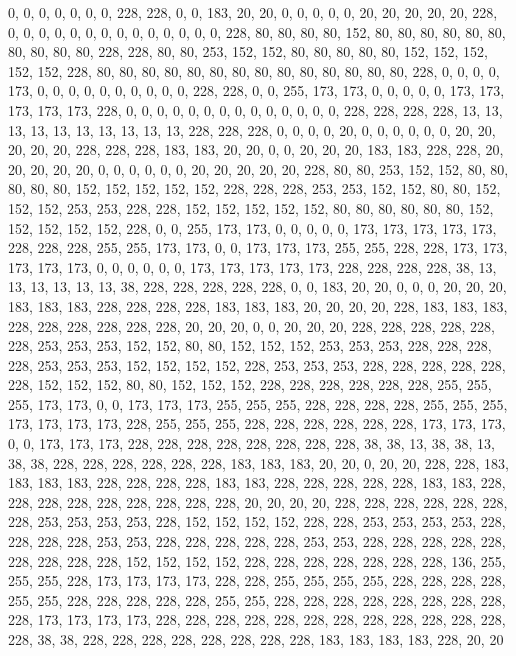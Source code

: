 {	0,   0,   0,   0,   0,   0,   0,   228, 228, 0,   0,   183, 20,  20,  0,   0,   0,   0,   0,   20,  20,  20,  20,  20,  228, 0,   0,   0,   0,   0,   0,   0,   0,   0,   0,   0,   0,   0,   0,   228, 80,  80,  80,  80,  152, 80,  80,  80,  80,  80,  80,  80,  80,  80,  80,  228, 228, 80,  80,  253, 152, 152, 80,  80,  80,  80,  80,  152, 152, 152, 152, 152, 228, 80,  80,  80,  80,  80,  80,  80,  80,  80,  80,  80,  80,  80,  80,  228, 0,   0,   0,   0,   173, 0,   0,   0,   0,   0,   0,   0,   0,   0,   0,   228, 228, 0,   0,   255, 173, 173, 0,   0,   0,   0,   0,   173, 173, 173, 173, 173, 228, 0,   0,   0,   0,   0,   0,   0,   0,   0,   0,   0,   0,   0,   0,   228, 228, 228, 228, 13,  13,  13,  13,  13,  13,  13,  13,  13,  13,  228, 228, 228, 0,   0,   0,   0,   20,  0,   0,   0,   
	0,   0,   0,   20,  20,  20,  20,  20,  228, 228, 228, 183, 183, 20,  20,  0,   0,   20,  20,  20,  183, 183, 228, 228, 20,  20,  20,  20,  20,  0,   0,   0,   0,   0,   0,   20,  20,  20,  20,  20,  228, 80,  80,  253, 152, 152, 80,  80,  80,  80,  80,  152, 152, 152, 152, 152, 228, 228, 228, 253, 253, 152, 152, 80,  80,  152, 152, 152, 253, 253, 228, 228, 152, 152, 152, 152, 152, 80,  80,  80,  80,  80,  80,  152, 152, 152, 152, 152, 228, 0,   0,   255, 173, 173, 0,   0,   0,   0,   0,   173, 173, 173, 173, 173, 228, 228, 228, 255, 255, 173, 173, 0,   0,   173, 173, 173, 255, 255, 228, 228, 173, 173, 173, 173, 173, 0,   0,   0,   0,   0,   0,   173, 173, 173, 173, 173, 228, 228, 228, 228, 38,  13,  13,  13,  13,  13,  13,  38,  228, 228, 228, 228, 228, 0,   0,   183, 20,  20,  0,   0,   
	0,   20,  20,  20,  183, 183, 183, 228, 228, 228, 228, 183, 183, 183, 20,  20,  20,  20,  228, 183, 183, 183, 228, 228, 228, 228, 228, 228, 20,  20,  20,  0,   0,   20,  20,  20,  228, 228, 228, 228, 228, 228, 253, 253, 253, 152, 152, 80,  80,  152, 152, 152, 253, 253, 253, 228, 228, 228, 228, 253, 253, 253, 152, 152, 152, 152, 228, 253, 253, 253, 228, 228, 228, 228, 228, 228, 152, 152, 152, 80,  80,  152, 152, 152, 228, 228, 228, 228, 228, 228, 255, 255, 255, 173, 173, 0,   0,   173, 173, 173, 255, 255, 255, 228, 228, 228, 228, 255, 255, 255, 173, 173, 173, 173, 228, 255, 255, 255, 228, 228, 228, 228, 228, 228, 173, 173, 173, 0,   0,   173, 173, 173, 228, 228, 228, 228, 228, 228, 228, 228, 38,  38,  13,  38,  38,  13,  38,  38,  228, 228, 228, 228, 228, 228, 183, 183, 183, 20,  20,  0,   
	20,  20,  228, 228, 183, 183, 183, 183, 228, 228, 228, 228, 183, 183, 228, 228, 228, 228, 228, 183, 183, 228, 228, 228, 228, 228, 228, 228, 228, 228, 20,  20,  20,  20,  228, 228, 228, 228, 228, 228, 228, 253, 253, 253, 253, 228, 152, 152, 152, 152, 228, 228, 253, 253, 253, 253, 228, 228, 228, 228, 253, 253, 228, 228, 228, 228, 228, 253, 253, 228, 228, 228, 228, 228, 228, 228, 228, 228, 152, 152, 152, 152, 228, 228, 228, 228, 228, 228, 228, 136, 255, 255, 255, 228, 173, 173, 173, 173, 228, 228, 255, 255, 255, 255, 228, 228, 228, 228, 255, 255, 228, 228, 228, 228, 228, 255, 255, 228, 228, 228, 228, 228, 228, 228, 228, 228, 173, 173, 173, 173, 228, 228, 228, 228, 228, 228, 228, 228, 228, 228, 228, 228, 228, 38,  38,  228, 228, 228, 228, 228, 228, 228, 228, 183, 183, 183, 183, 228, 20,  20 
}

